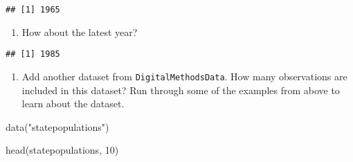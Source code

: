 \documentclass[
]{article}
\newenvironment{Shaded}{\begin{snugshade}}{\end{snugshade}}
\newcommand{\DecValTok}[1]{\textcolor[rgb]{0.00,0.00,0.81}{#1}}
\newcommand{\FunctionTok}[1]{\textcolor[rgb]{0.00,0.00,0.00}{#1}}
\newcommand{\NormalTok}[1]{#1}
\newcommand{\SpecialCharTok}[1]{\textcolor[rgb]{0.00,0.00,0.00}{#1}}
\newcommand{\StringTok}[1]{\textcolor[rgb]{0.31,0.60,0.02}{#1}}
\providecommand{\tightlist}{%
  \setlength{\itemsep}{0pt}\setlength{\parskip}{0pt}}
\begin{document}
\begin{verbatim}
## [1] 1965
\end{verbatim}

\begin{enumerate}
\def\labelenumi{(\arabic{enumi})}
\setcounter{enumi}{24}
\tightlist
\item
  How about the latest year?
\end{enumerate}

\begin{Shaded}
\end{Shaded}

\begin{verbatim}
## [1] 1985
\end{verbatim}

\begin{enumerate}
\def\labelenumi{(\arabic{enumi})}
\setcounter{enumi}{25}
\tightlist
\item
  Add another dataset from \texttt{DigitalMethodsData}. How many
  observations are included in this dataset? Run through some of the
  examples from above to learn about the dataset.
\end{enumerate}

\begin{Shaded}
\begin{Highlighting}[]
\FunctionTok{data}\NormalTok{(}\StringTok{"statepopulations"}\NormalTok{)}
\end{Highlighting}
\end{Shaded}

\begin{Shaded}
\begin{Highlighting}[]
\FunctionTok{head}\NormalTok{(statepopulations, }\DecValTok{10}\NormalTok{)}
\end{Highlighting}
\end{Shaded}
\end{document}
